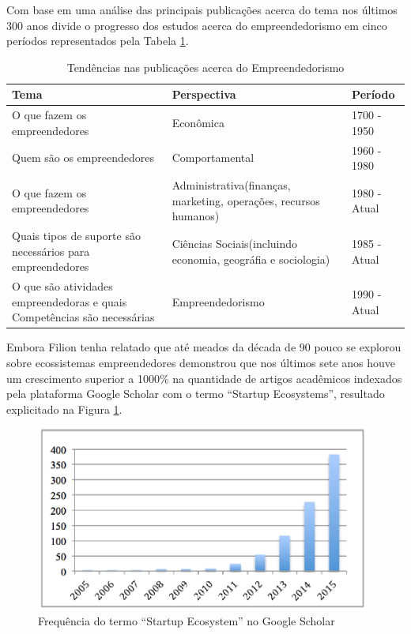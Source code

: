 Com base em uma análise das principais publicações acerca do tema nos últimos 300 anos  divide o progresso dos estudos acerca do empreendedorismo em cinco períodos representados pela Tabela \ref{table:tendencias_nas_publicacoes_acerca_do_empreendedorismo}.

\begin{table}[!htb]
	\centering
	\begin{tabular}{ | p{6cm} | p{6cm} | p{3cm} | }
		\hline
		Tema & Perspectiva & Período \\ \hline
		O que fazem os empreendedores & Econômica & 1700 - 1950 \\ \hline
		Quem são os empreendedores & Comportamental & 1960 - 1980 \\ \hline
		O que fazem os empreendedores & Administrativa(finanças, marketing, operações, recursos humanos) & 1980 - Atual \\ \hline
		Quais tipos de suporte são necessários para empreendedores & Ciências Sociais(incluindo economia, geográfia e sociologia) & 1985 - Atual \\ \hline
		O que são atividades empreendedoras e quais Competências são necessárias & Empreendedorismo & 1990 - Atual \\ \hline
	\end{tabular}
	\caption{Tendências nas publicações acerca do Empreendedorismo}
	\label{table:tendencias_nas_publicacoes_acerca_do_empreendedorismo}
\end{table}


Embora Filion tenha relatado que até meados da década de 90 pouco se explorou sobre ecossistemas empreendedores   demonstrou que nos últimos sete anos houve um crescimento superior a 1000\% na quantidade de artigos acadêmicos indexados pela plataforma Google Scholar com o termo ``Startup Ecosystems'', resultado explicitado na Figura \ref{figure:papers_about_startup_ecosystems}.

\begin{figure}[!htb]
	\centering
	\includegraphics[width=11cm,angle=0]{figuras/papers_about_startup_ecosystems}
	\caption{Frequência do termo ``Startup Ecosystem'' no Google Scholar}
	\label{figure:papers_about_startup_ecosystems}
\end{figure}

